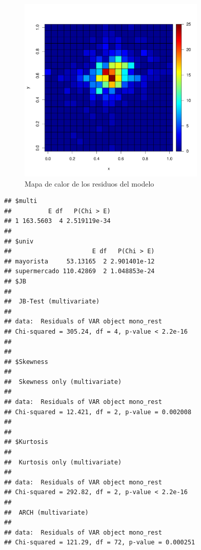 \documentclass[12pt, twoside]{book}\usepackage[]{graphicx}\usepackage[]{color}
\makeatletter
\newenvironment{kframe}{%
 \def\at@end@of@kframe{}%
 \ifinner\ifhmode%
  \def\at@end@of@kframe{\end{minipage}}%
  \begin{minipage}{\columnwidth}%
 \fi\fi%
 \def\FrameCommand##1{\hskip\@totalleftmargin \hskip-\fboxsep
 \colorbox{shadecolor}{##1}\hskip-\fboxsep
     \hskip-\linewidth \hskip-\@totalleftmargin \hskip\columnwidth}%
 \MakeFramed {\advance\hsize-\width
   \@totalleftmargin\z@ \linewidth\hsize
   \@setminipage}}%
 {\par\unskip\endMakeFramed%
 \at@end@of@kframe}
\newenvironment{knitrout}{}{} %
\numberwithin{equation}{section}
\numberwithin{theorem}{section}
\numberwithin{teorema}{section}
\numberwithin{defi}{section}
\numberwithin{prop}{section}
\numberwithin{defi}{section}
\theoremstyle{plain}
\makeatother
\begin{document}
\begin{knitrout}
\color{fgcolor}\begin{figure}[H]

{\centering \includegraphics[width=3.5in,height=3.5in]{figure/fig-5_12-1} 

}

\caption[Mapa de calor de los residuos del modelo]{Mapa de calor de los residuos del modelo}\label{fig:fig-5.12}
\end{figure}


\end{knitrout}


\begin{knitrout}
\color{fgcolor}\begin{kframe}
\begin{verbatim}
## $multi
##          E df   P(Chi > E)
## 1 163.5603  4 2.519119e-34
## 
## $univ
##                      E df   P(Chi > E)
## mayorista     53.13165  2 2.901401e-12
## supermercado 110.42869  2 1.048853e-24
## $JB
## 
## 	JB-Test (multivariate)
## 
## data:  Residuals of VAR object mono_rest
## Chi-squared = 305.24, df = 4, p-value < 2.2e-16
## 
## 
## $Skewness
## 
## 	Skewness only (multivariate)
## 
## data:  Residuals of VAR object mono_rest
## Chi-squared = 12.421, df = 2, p-value = 0.002008
## 
## 
## $Kurtosis
## 
## 	Kurtosis only (multivariate)
## 
## data:  Residuals of VAR object mono_rest
## Chi-squared = 292.82, df = 2, p-value < 2.2e-16
## 
## 	ARCH (multivariate)
## 
## data:  Residuals of VAR object mono_rest
## Chi-squared = 121.29, df = 72, p-value = 0.000251
\end{verbatim}
\end{kframe}
\end{knitrout}
\end{document}
